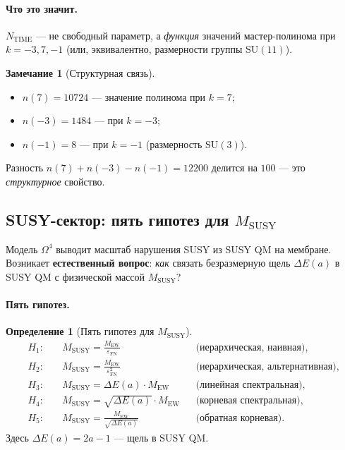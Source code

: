\documentclass[11pt,a4paper]{article}
\newcommand{\SU}{\mathrm{SU}}
\newcommand{\Om}{\Omega^4}
\newcommand{\MEW}{M_{\text{EW}}}
\newcommand{\MSUSY}{M_{\text{SUSY}}}
\newcommand{\epsFN}{\varepsilon_{\text{FN}}}
\theoremstyle{definition}
\newtheorem{definition}[theorem]{Определение}
\newtheorem{remark}[theorem]{Замечание}
\begin{document}
\paragraph{Что это значит.}
$N_{\text{TIME}}$ — не свободный параметр, а \emph{функция} 
значений мастер-полинома при $k = -3, 7, -1$ (или, эквивалентно, 
размерности группы $\SU(11)$).

\begin{remark}[Структурная связь]
\label{rem:time-structural}
\begin{itemize}
    \item $n(7) = 10724$ — значение полинома при $k = 7$;
    \item $n(-3) = 1484$ — при $k = -3$;
    \item $n(-1) = 8$ — при $k = -1$ (размерность $\SU(3)$).
\end{itemize}
Разность $n(7) + n(-3) - n(-1) = 12200$ делится на $100$ — 
это \emph{структурное} свойство.
\end{remark}

\subsection{SUSY-сектор: пять гипотез для \texorpdfstring{$\MSUSY$}{M\_SUSY}}
\label{subsec:susy-hypotheses-review}

Модель $\Om$ выводит масштаб нарушения SUSY из SUSY QM 
на мембране. Возникает \textbf{естественный вопрос}: \emph{как} 
связать безразмерную щель $\Delta E(a)$ в SUSY QM с физической 
массой $\MSUSY$?

\paragraph{Пять гипотез.}
\begin{definition}[Пять гипотез для $\MSUSY$]
\label{def:five-hypotheses-review}
\begin{align}
    H_1:&\quad \MSUSY = \frac{\MEW}{\epsFN} 
    && \text{(иерархическая, наивная)}, \\
    H_2:&\quad \MSUSY = \frac{\MEW}{\epsFN^2} 
    && \text{(иерархическая, альтернативная)}, \\
    H_3:&\quad \MSUSY = \Delta E(a) \cdot \MEW 
    && \text{(линейная спектральная)}, \\
    H_4:&\quad \MSUSY = \sqrt{\Delta E(a)} \cdot \MEW 
    && \text{(корневая спектральная)}, \\
    H_5:&\quad \MSUSY = \frac{\MEW}{\sqrt{\Delta E(a)}} 
    && \text{(обратная корневая)}.
\end{align}
Здесь $\Delta E(a) = 2a - 1$ — щель в SUSY QM.
\end{definition}
\end{document}
